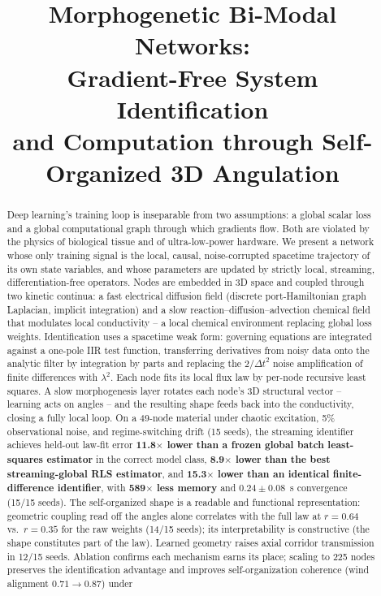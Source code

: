 \documentclass[conference]{IEEEtran}
\title{Morphogenetic Bi-Modal Networks:\\
Gradient-Free System Identification\\
and Computation through Self-Organized 3D Angulation}
\author{\IEEEauthorblockN{Preprint}
\IEEEauthorblockA{Every quantitative claim is the measured output of the
accompanying experiment suite\\
(\texttt{results.json}, \texttt{ablation.json}, \texttt{scaling.json})}}
\begin{document}
\maketitle

\begin{abstract}
Deep learning's training loop is inseparable from two assumptions: a global scalar
loss and a global computational graph through which gradients flow. Both are violated
by the physics of biological tissue and of ultra-low-power hardware. We present a
network whose only training signal is the local, causal, noise-corrupted spacetime
trajectory of its own state variables, and whose parameters are updated by strictly
local, streaming, differentiation-free operators. Nodes are embedded in 3D space and
coupled through two kinetic continua: a fast electrical diffusion field (discrete
port-Hamiltonian graph Laplacian, implicit integration) and a slow
reaction--diffusion--advection chemical field that modulates local conductivity --
a local chemical environment replacing global loss weights. Identification uses a
spacetime weak form: governing equations are integrated against a one-pole IIR test
function, transferring derivatives from noisy data onto the analytic filter by
integration by parts and replacing the $2/\Delta t^2$ noise amplification of finite
differences with $\lambda^2$. Each node fits its local flux law by per-node recursive
least squares. A slow morphogenesis layer rotates each node's 3D structural vector --
learning acts on angles -- and the resulting shape feeds back into the conductivity,
closing a fully local loop. On a 49-node material under chaotic excitation, 5\%
observational noise, and regime-switching drift (15 seeds), the streaming identifier
achieves held-out law-fit error \textbf{11.8$\times$ lower than a frozen global batch
least-squares estimator} in the correct model class, \textbf{8.9$\times$ lower than
the best streaming-global RLS estimator}, and \textbf{15.3$\times$ lower than an
identical finite-difference identifier}, with \textbf{589$\times$ less memory} and
$0.24\pm0.08$~s convergence (15/15 seeds). The self-organized shape is a readable and
functional representation: geometric coupling read off the angles alone correlates
with the full law at $r=0.64$ vs.\ $r=0.35$ for the raw weights (14/15 seeds); its
interpretability is constructive (the shape constitutes part of the law). Learned
geometry raises axial corridor transmission in 12/15 seeds. Ablation confirms each
mechanism earns its place; scaling to 225 nodes preserves the identification advantage
and improves self-organization coherence (wind alignment $0.71 \to 0.87$) under

\end{abstract}
\end{document}
